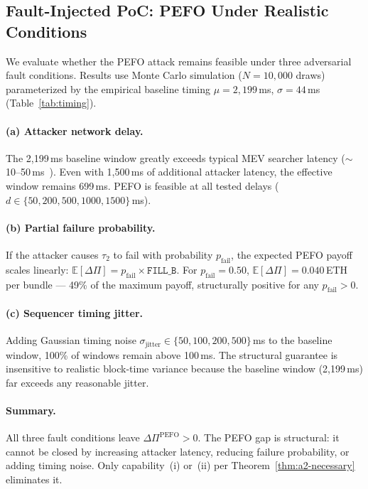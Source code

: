 \subsection{Fault-Injected PoC: PEFO Under Realistic Conditions}
\label{sec:meas-faultinject}

We evaluate whether the PEFO attack remains feasible under three adversarial
fault conditions. Results use Monte Carlo simulation ($N=10{,}000$ draws)
parameterized by the empirical baseline timing $\mu = 2{,}199$\,ms,
$\sigma = 44$\,ms (Table~\ref{tab:timing}).

\paragraph{(a) Attacker network delay.}
The 2,199\,ms baseline window greatly exceeds typical MEV searcher latency
($\sim$10--50\,ms~\cite{daian2020flash}). Even with 1,500\,ms of additional
attacker latency, the effective window remains 699\,ms. PEFO is feasible at
all tested delays ($d \in \{50, 200, 500, 1000, 1500\}$\,ms).

\paragraph{(b) Partial failure probability.}
If the attacker causes $\tau_2$ to fail with probability $p_{\text{fail}}$,
the expected PEFO payoff scales linearly:
$\mathbb{E}[\Delta\Pi] = p_{\text{fail}} \times \texttt{FILL\_B}$.
For $p_{\text{fail}} = 0.50$, $\mathbb{E}[\Delta\Pi] = 0.040$\,ETH per
bundle --- 49\% of the maximum payoff, structurally positive for any
$p_{\text{fail}} > 0$.

\paragraph{(c) Sequencer timing jitter.}
Adding Gaussian timing noise $\sigma_{\text{jitter}} \in \{50, 100, 200,
500\}$\,ms to the baseline window, 100\% of windows remain above 100\,ms.
The structural guarantee is insensitive to realistic block-time
variance because the baseline window (2,199\,ms) far exceeds any
reasonable jitter.

\paragraph{Summary.}
All three fault conditions leave $\Delta\Pi^{\text{PEFO}} > 0$. The PEFO
gap is structural: it cannot be closed by increasing attacker latency,
reducing failure probability, or adding timing noise. Only
capability~(i) or~(ii) per Theorem~\ref{thm:a2-necessary} eliminates it.

